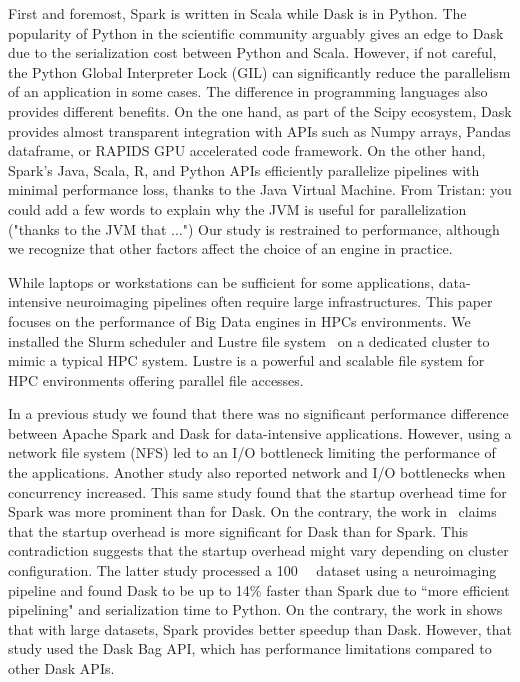 \documentclass[conference]{IEEEtran}
\newcommand{\TG}[1]{\color{cyan}From Tristan: #1 \color{black}}
\begin{document}
First and foremost, Spark is written in Scala while Dask is in Python.
The popularity of Python in the scientific community arguably gives an edge to Dask due to the serialization cost between Python and Scala.
However, if not careful, the Python Global Interpreter Lock (GIL) can significantly reduce the parallelism of an application in some cases.
The difference in programming languages also provides different benefits.
On the one hand, as part of the Scipy ecosystem, Dask provides almost transparent integration with APIs such as Numpy arrays, Pandas dataframe, or RAPIDS GPU accelerated code framework.
On the other hand, Spark's Java, Scala, R, and Python APIs efficiently parallelize pipelines with minimal performance loss, thanks to the Java Virtual Machine. \TG{you could add a few words to explain why the JVM is useful for parallelization ("thanks to the JVM that ...")}
Our study is restrained to performance, although we recognize that other factors affect the choice of an engine in practice.

While laptops or workstations can be sufficient for some applications, data-intensive neuroimaging pipelines often require large infrastructures.
This paper focuses on the performance of Big Data engines in HPCs environments.
We installed the Slurm scheduler and Lustre file system~\cite{braam2019lustre} on a dedicated cluster to mimic a typical HPC system.
Lustre is a powerful and scalable file system for HPC environments offering parallel file accesses.

In a previous study\cite{8943502} we found that there was no significant performance difference between Apache Spark and Dask for data-intensive applications.
However, using a network file system (NFS) led to an I/O bottleneck limiting the performance of the applications.
Another study \cite{8588652} also reported network and I/O bottlenecks when concurrency increased.
This same study found that the startup overhead time for Spark was more prominent than for Dask.
On the contrary, the work in~\cite{Mehta:17} claims that the startup overhead is more significant for Dask than for Spark.
This contradiction suggests that the startup overhead might vary depending on cluster configuration.
The latter study processed a \SI{100}{\giga\byte} dataset using a neuroimaging pipeline and found Dask to be up to 14\% faster than Spark due to ``more efficient pipelining" and serialization time to Python.
On the contrary, the work in \cite{10.1145/3225058.3225128} shows that with large datasets, Spark provides better speedup than Dask.
However, that study used the Dask Bag API, which has performance limitations compared to other Dask APIs.
\end{document}
